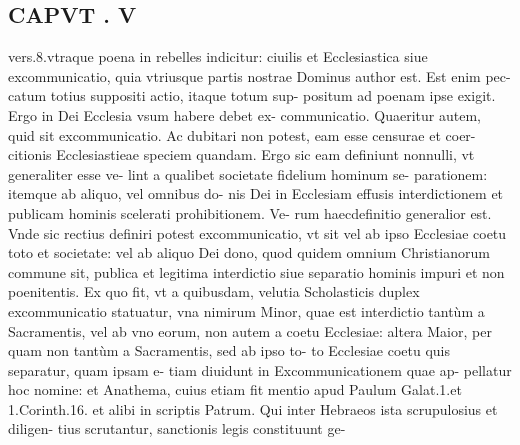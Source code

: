 \documentclass{article}
\begin{document}
\begin{pages}
\section*{CAPVT . V }\pstart vers.8.vtraque poena in rebelles indicitur: ciuilis et Ecclesiastica siue excommunicatio, quia vtriusque  partis nostrae Dominus author est. Est enim pec- catum totius suppositi actio, itaque totum sup- positum ad poenam ipse exigit.  \pend\pstart Ergo in Dei Ecclesia vsum habere debet ex- communicatio.  \pend\pstart Quaeritur autem, quid sit excommunicatio. Ac dubitari non potest, eam esse censurae et coer- citionis Ecclesiastieae speciem quandam. Ergo sic eam definiunt nonnulli, vt generaliter esse ve- lint a qualibet societate fidelium hominum se- parationem: itemque ab aliquo, vel omnibus do- nis Dei in Ecclesiam effusis interdictionem et publicam hominis scelerati prohibitionem. Ve- rum haecdefinitio generalior est. Vnde sic rectius definiri potest excommunicatio, vt sit vel ab ipso Ecclesiae coetu toto et societate: vel ab aliquo Dei dono, quod quidem omnium Christianorum commune sit, publica et legitima interdictio siue separatio hominis impuri et non poenitentis. Ex quo fit, vt a quibusdam, velutia Scholasticis duplex excommunicatio statuatur, vna nimirum Minor, quae est interdictio tantùm a Sacramentis, vel ab vno eorum, non autem a coetu Ecclesiae: altera Maior, per quam non tantùm a Sacramentis, sed ab ipso to- to Ecclesiae coetu quis separatur, quam ipsam e- tiam diuidunt in Excommunicationem quae ap- pellatur hoc nomine: et Anathema, cuius etiam fit mentio apud Paulum Galat.1.et 1.Corinth.16. et alibi in scriptis Patrum.  \pend\pstart Qui inter Hebraeos ista scrupulosius et diligen- tius scrutantur, sanctionis legis constituunt ge-  \pend

\end{pages}
\end{document}
